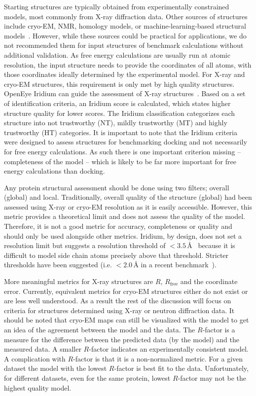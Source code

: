 \documentclass[9pt,bestpractices,pubversion]{livecoms}
\begin{document}
Starting structures are typically obtained from experimentally constrained models, most commonly from X-ray diffraction data.
Other sources of structures include cryo-EM, NMR, homology models, or machine-learning-based structural models~\cite{courniaRelativeBindingFree2017,courniaRigorousFreeEnergy2020,schindler_largescale_2020,jumper_highly_2021}. However, while these sources could be practical for applications, we do not recommended them for input structures of benchmark calculations without additional validation.
As free energy calculations are usually run at atomic resolution, the input structure needs to provide the coordinates of all atoms, with those coordinates ideally determined by the experimental model.
%
For X-ray and cryo-EM structures, this requirement is only met by high quality structures.
OpenEye Iridium can guide the assessment of X-ray structures~\cite{warrenEssentialConsiderationsUsing2012}. Based on a set of identification criteria, an Iridium score is calculated, which states higher structure quality for lower scores. The Iridium classification categorizes each structure into not trustworthy (NT),
mildly trustworthy (MT) and highly trustworthy (HT) categories. It is important to note that the Iridium criteria were designed to assess structures for benchmarking docking and not necessarily for free energy calculations. As such there is one important criterion missing -- completeness of the model -- which is likely to be far more important for free energy calculations than docking.

Any protein structural assessment should be done using two filters; overall (global) and local. Traditionally, overall quality of the structure (global) had been assessed using X-ray or cryo-EM resolution as it is easily accessible.
%
However, this metric provides a theoretical limit and does not assess the quality of the model. Therefore, it is not a good metric for accuracy, completeness or quality and should only be used alongside other metrics. Iridium, by design, does not set a resolution limit but suggests a resolution threshold of $< 3.5\,$\AA{}~\cite{warrenEssentialConsiderationsUsing2012} because it is difficult to model side chain atoms precisely above that threshold. Stricter thresholds have been suggested (i.e. $<2.0\,$\AA{}  in a recent benchmark~\cite{schindler_largescale_2020}).

More meaningful metrics for X-ray structures are $R$, $R_{\mathrm{free}}$ and the coordinate error. Currently, equivalent metrics for cryo-EM structures either do not exist or are less well understood.  As a result the rest of the discussion will focus on criteria for structures determined using X-ray or neutron diffraction data.  It should be noted that cryo-EM maps can still be visualized with the model to get an idea of the agreement between the model and the data.
%
The $R$-factor is a measure for the difference between the predicted data (by the model) and the measured data. A smaller $R$-factor indicates an experimentally consistent model. A complication with $R$-factor is that it is a non-normalized metric. For a given dataset the model with the lowest $R$-factor is best fit to the data.  Unfortunately, for different datasets, even for the same protein, lowest $R$-factor may not be the highest quality model. 
\end{document}
